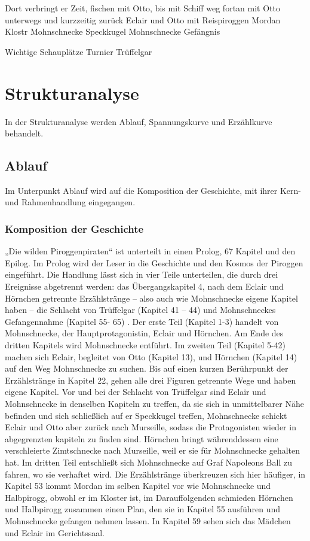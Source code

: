 Dort verbringt er Zeit, fischen mit Otto, bis mit Schiff weg fortan mit Otto unterwegs und kurzzeitig zurück
Eclair und Otto mit Reispiroggen
Mordan Klostr
Mohnschnecke Speckkugel
Mohnschnecke Gefängnis

Wichtige Schauplätze
Turnier
Trüffelgar	


	
\chapter{Strukturanalyse}
In der Strukturanalyse werden Ablauf, Spannungskurve und Erzählkurve behandelt.

\section{Ablauf}
Im Unterpunkt Ablauf wird auf die Komposition der Geschichte, mit ihrer Kern- und Rahmenhandlung eingegangen.

\subsection{Komposition der Geschichte}
„Die wilden Piroggenpiraten“ ist unterteilt in einen Prolog, 67 Kapitel und den Epilog. Im Prolog wird der Leser in die Geschichte und den Kosmos der Piroggen eingeführt. Die Handlung lässt sich in vier Teile unterteilen, die durch drei Ereignisse abgetrennt werden: das Übergangskapitel 4, nach dem Eclair und Hörnchen getrennte Erzählstränge – also auch wie Mohnschnecke eigene Kapitel haben – die Schlacht von Trüffelgar (Kapitel 41 – 44) und Mohnschneckes Gefangennahme (Kapitel 55- 65) . Der erste Teil (Kapitel 1-3) handelt von Mohnschnecke, der Hauptprotagonistin, Eclair und Hörnchen. Am Ende des dritten Kapitels wird Mohnschnecke entführt. Im zweiten Teil (Kapitel 5-42) machen sich Eclair, begleitet von Otto (Kapitel 13), und Hörnchen (Kapitel 14) auf den Weg Mohnschnecke zu suchen. Bis auf einen kurzen Berührpunkt der Erzählstränge in Kapitel 22, gehen alle drei Figuren getrennte Wege und haben eigene Kapitel. Vor und bei der Schlacht von Trüffelgar sind Eclair und Mohnschnecke in denselben Kapiteln zu treffen, da sie sich in unmittelbarer Nähe befinden und sich schließlich auf er Speckkugel treffen,  Mohnschnecke schickt Eclair und Otto aber zurück nach Murseille, sodass die Protagonisten wieder in abgegrenzten kapiteln zu finden sind. Hörnchen bringt währenddessen eine verschleierte Zimtschnecke nach Murseille, weil er sie für Mohnschnecke gehalten hat. Im dritten Teil entschließt sich Mohnschnecke auf Graf Napoleons Ball zu fahren, wo sie verhaftet wird. Die Erzählstränge überkreuzen sich hier häufiger, in Kapitel 53 kommt Mordan im selben Kapitel vor wie Mohnschnecke und Halbpirogg, obwohl er im Kloster ist, im Darauffolgenden schmieden Hörnchen und Halbpirogg zusammen einen Plan, den sie in Kapitel 55 ausführen und Mohnschnecke gefangen nehmen lassen. In Kapitel 59 sehen sich das Mädchen und Eclair im Gerichtssaal. 

